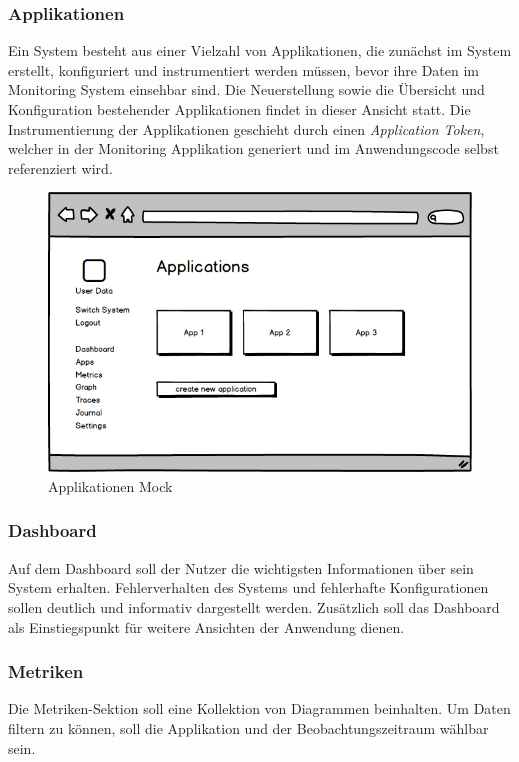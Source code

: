 \subsubsection{Applikationen}

Ein System besteht aus einer Vielzahl von Applikationen, die zunächst im System erstellt,
konfiguriert und instrumentiert werden müssen, bevor ihre Daten im Monitoring System einsehbar sind.
Die Neuerstellung sowie die Übersicht und Konfiguration bestehender Applikationen
findet in dieser Ansicht statt. Die Instrumentierung der Applikationen
geschieht durch einen \emph{Application Token}, welcher in der Monitoring
Applikation generiert und im Anwendungscode selbst referenziert wird.


\vspace{0.3cm}

\begin{figure}[h]
 \centering
 \includegraphics[width=0.6\linewidth]{kapitel1/mocks/apps.png}
 \caption{Applikationen Mock}
 \label{fig:apps}
\end{figure}


\subsubsection{Dashboard}

Auf dem Dashboard soll der Nutzer die wichtigsten Informationen über sein System erhalten.
Fehlerverhalten des Systems und fehlerhafte Konfigurationen sollen deutlich und informativ dargestellt werden.
Zusätzlich soll das Dashboard als Einstiegspunkt für weitere Ansichten der Anwendung dienen.

\subsubsection{Metriken}

Die Metriken-Sektion soll eine Kollektion von Diagrammen beinhalten.
Um Daten filtern zu können, soll die Applikation und der Beobachtungszeitraum wählbar sein.


